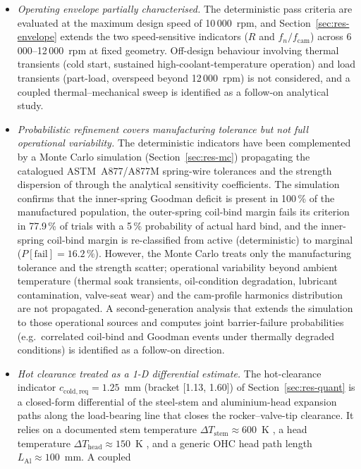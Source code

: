 \begin{itemize}
\item \emph{Operating envelope partially characterised.} The
deterministic pass criteria are evaluated at the maximum design
speed of 10\,000~rpm, and Section~\ref{sec:res-envelope} extends
the two speed-sensitive indicators ($R$ and
$f_{n}/f_{\mathrm{cam}}$) across 6\,000--12\,000~rpm at fixed
geometry. Off-design behaviour involving thermal transients
(cold start, sustained high-coolant-temperature operation) and
load transients (part-load, overspeed beyond 12\,000~rpm) is not
considered, and a coupled thermal--mechanical sweep is identified
as a follow-on analytical study.
\item \emph{Probabilistic refinement covers manufacturing tolerance
but not full operational variability.} The deterministic indicators
have been complemented by a Monte Carlo simulation
(Section~\ref{sec:res-mc}) propagating the catalogued ASTM~A877/A877M
spring-wire tolerances and the strength dispersion of
\citet[\S~10-30]{shigley2020} through the analytical sensitivity
coefficients. The simulation confirms that the inner-spring Goodman
deficit is present in 100\,\% of the manufactured population, the
outer-spring coil-bind margin fails its criterion in 77.9\,\% of
trials with a 5\,\% probability of actual hard bind, and the
inner-spring coil-bind margin is re-classified from active
(deterministic) to marginal ($P[\mathrm{fail}]=16.2\,\%$). However,
the Monte Carlo treats only the manufacturing tolerance and the
strength scatter; operational variability beyond ambient temperature
(thermal soak transients, oil-condition degradation, lubricant
contamination, valve-seat wear) and the cam-profile harmonics
distribution are not propagated. A second-generation analysis that
extends the simulation to those operational sources and computes
joint barrier-failure probabilities (e.g.\ correlated coil-bind
and Goodman events under thermally degraded conditions) is identified
as a follow-on direction.
\item \emph{Hot clearance treated as a 1-D differential estimate.}
The hot-clearance indicator
$c_{\mathrm{cold,req}}=1.25$~mm (bracket [1.13, 1.60]) of
Section~\ref{sec:res-quant} is a closed-form differential of the
steel-stem and aluminium-head expansion paths along the
load-bearing line that closes the rocker--valve-tip clearance. It
relies on a documented stem temperature
$\Delta T_{\mathrm{stem}}\approx 600$~K
\citep{heisler2002}, a head temperature
$\Delta T_{\mathrm{head}}\approx 150$~K
\citep{heywood1988}, and a generic OHC head path length
$L_{\mathrm{Al}}\approx 100$~mm. A coupled

\end{itemize}
